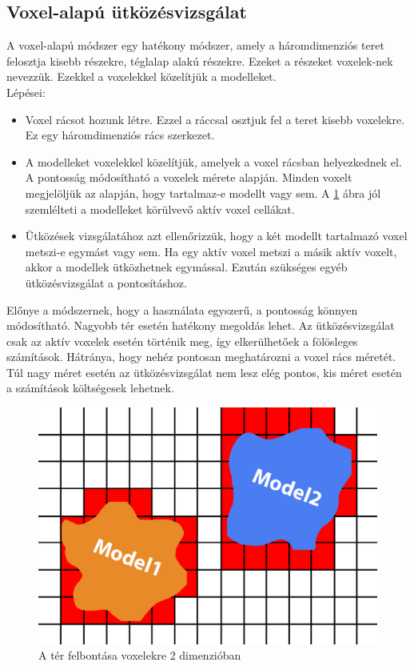 \subsection{Voxel-alapú ütközésvizsgálat}
A voxel-alapú módszer egy hatékony módszer, amely a háromdimenziós teret felosztja kisebb részekre, téglalap alakú részekre. Ezeket a részeket voxelek-nek nevezzük.
Ezekkel a voxelekkel közelítjük a modelleket.
\\
Lépései:
\begin{itemize}
\item Voxel rácsot hozunk létre. Ezzel a ráccsal osztjuk fel a teret kisebb voxelekre. Ez egy háromdimenziós rács szerkezet.

\item A modelleket voxelekkel közelítjük, amelyek a voxel rácsban helyezkednek el. A pontosság módosítható a voxelek mérete alapján. Minden voxelt megjelöljük az alapján, hogy tartalmaz-e modellt vagy sem. A \ref{fig:con_3} ábra jól szemlélteti a modelleket körülvevő aktív voxel cellákat.

\item Ütközések vizsgálatához azt ellenőrizzük, hogy a két modellt tartalmazó voxel metszi-e egymást vagy sem. Ha egy aktív voxel metszi a másik aktív voxelt, akkor a modellek ütközhetnek egymással. Ezután szükséges egyéb ütközésvizsgálat a pontosításhoz.
\end{itemize}
Előnye a módszernek, hogy a használata egyszerű, a pontosság könnyen módosítható. Nagyobb tér esetén hatékony megoldás lehet. Az ütközésvizsgálat csak az aktív voxelek esetén történik meg, így elkerülhetőek a fölösleges számítások. Hátránya, hogy nehéz pontosan meghatározni a voxel rács méretét. Túl nagy méret esetén az ütközésvizsgálat nem lesz elég pontos, kis méret esetén a számítások költségesek lehetnek.
\begin{figure}[h]
	\centering
	\includegraphics[width=13truecm, height=7.5truecm]{images/con3.png}
	\caption{A tér felbontása voxelekre 2 dimenzióban}
	\label{fig:con_3}
\end{figure}

